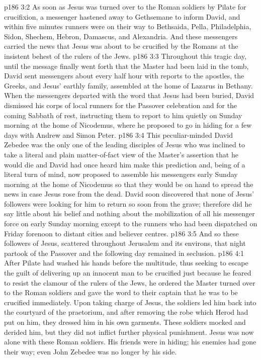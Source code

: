 \vs p186 3:2 As soon as Jesus was turned over to the Roman soldiers by Pilate for crucifixion, a messenger hastened away to Gethsemane to inform David, and within five minutes runners were on their way to Bethsaida, Pella, Philadelphia, Sidon, Shechem, Hebron, Damascus, and Alexandria. And these messengers carried the news that Jesus was about to be crucified by the Romans at the insistent behest of the rulers of the Jews.
\vs p186 3:3 Throughout this tragic day, until the message finally went forth that the Master had been laid in the tomb, David sent messengers about every half hour with reports to the apostles, the Greeks, and Jesus’ earthly family, assembled at the home of Lazarus in Bethany. When the messengers departed with the word that Jesus had been buried, David dismissed his corps of local runners for the Passover celebration and for the coming Sabbath of rest, instructing them to report to him quietly on Sunday morning at the home of Nicodemus, where he proposed to go in hiding for a few days with Andrew and Simon Peter.
\vs p186 3:4 This peculiar\hyp{}minded David Zebedee was the only one of the leading disciples of Jesus who was inclined to take a literal and plain matter\hyp{}of\hyp{}fact view of the Master’s assertion that he would die and  David had once heard him make this prediction and, being of a literal turn of mind, now proposed to assemble his messengers early Sunday morning at the home of Nicodemus so that they would be on hand to spread the news in case Jesus rose from the dead. David soon discovered that none of Jesus’ followers were looking for him to return so soon from the grave; therefore did he say little about his belief and nothing about the mobilization of all his messenger force on early Sunday morning except to the runners who had been dispatched on Friday forenoon to distant cities and believer centres.
\vs p186 3:5 And so these followers of Jesus, scattered throughout Jerusalem and its environs, that night partook of the Passover and the following day remained in seclusion.
\vs p186 4:1 After Pilate had washed his hands before the multitude, thus seeking to escape the guilt of delivering up an innocent man to be crucified just because he feared to resist the clamour of the rulers of the Jews, he ordered the Master turned over to the Roman soldiers and gave the word to their captain that he was to be crucified immediately. Upon taking charge of Jesus, the soldiers led him back into the courtyard of the praetorium, and after removing the robe which Herod had put on him, they dressed him in his own garments. These soldiers mocked and derided him, but they did not inflict further physical punishment. Jesus was now alone with these Roman soldiers. His friends were in hiding; his enemies had gone their way; even John Zebedee was no longer by his side.
